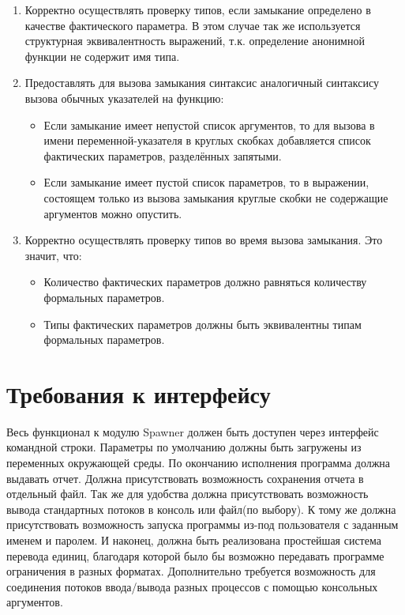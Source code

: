 \documentclass{imcs}
\begin{document}
\begin{enumerate}

        
      \item Корректно осуществлять проверку типов, если замыкание определено в качестве фактического параметра.
В этом случае так же используется структурная эквивалентность выражений, т.к. определение анонимной функции не
содержит имя типа.

        
    \item Предоставлять для вызова замыкания синтаксис аналогичный синтаксису вызова обычных указателей
 на функцию:
        \begin{itemize}
          \item Если замыкание имеет непустой список аргументов, то для вызова в имени переменной-указателя
в круглых скобках добавляется список фактических параметров, разделённых запятыми.
          \item Если замыкание имеет пустой список параметров, то в выражении, состоящем только из вызова
замыкания круглые скобки не содержащие аргументов можно опустить.

        \end{itemize}
        
  \item Корректно осуществлять проверку типов во время вызова замыкания. Это значит, что:
        \begin{itemize}
          \item Количество фактических параметров должно равняться количеству формальных параметров.
          \item Типы фактических параметров должны быть эквивалентны типам формальных параметров.
        \end{itemize}

    
\end{enumerate}


\section{Требования к интерфейсу}

Весь функционал к модулю Spawner должен быть доступен через интерфейс командной строки. Параметры по умолчанию должны быть загружены из переменных окружающей среды. По окончанию исполнения программа должна выдавать отчет. Должна присутствовать возможность сохранения отчета в отдельный файл. Так же для удобства должна присутствовать возможность вывода стандартных потоков в консоль или файл(по выбору). К тому же должна присутствовать возможность запуска программы из-под пользователя с заданным именем и паролем. И наконец, должна быть реализована простейшая система перевода единиц, благодаря которой было бы возможно передавать программе ограничения в разных форматах. Дополнительно требуется возможность для соединения потоков ввода/вывода разных процессов с помощью консольных аргументов.
\end{document}
